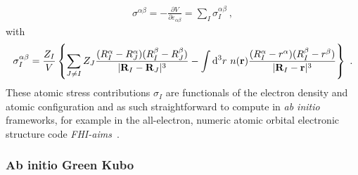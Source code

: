 \begin{align}
  \sigma^{\alpha \beta} 
    = - \frac{\partial V}{\partial \varepsilon_{\alpha \beta}}
    = \sum_I \sigma_I^{\alpha \beta}~,
  \label{eq:hf.sigma}
\end{align}
with
\begin{align}
  \sigma_I^{\alpha \beta}
    = \frac{Z_I}{V}
        \left\{ 
        \sum_{J \neq I} Z_J \frac{(R_I^\alpha - R_J^\alpha) (R_I^\beta - R_J^\beta)}{\lvert {\bf R}_I - {\bf R}_J \rvert^3}
        - \int {\rm d}^3 r ~ n({\bf r}) \frac{(R_I^\alpha - r^\alpha) (R_I^\beta - r^\beta)}{\lvert {\bf R}_I - {\bf r} \vert^3}
        \right\}~.
  \label{eq:hf.sigma_I}
\end{align}
These atomic stress contributions $\sigma_I$ are functionals of the electron density and atomic configuration and as such straightforward to compute in \emph{ab initio} frameworks, for example in the all-electron, numeric atomic orbital electronic structure code \emph{FHI-aims}~\cite{FHI-aims,Knuth2015}.


\subsubsection{Ab initio Green Kubo}